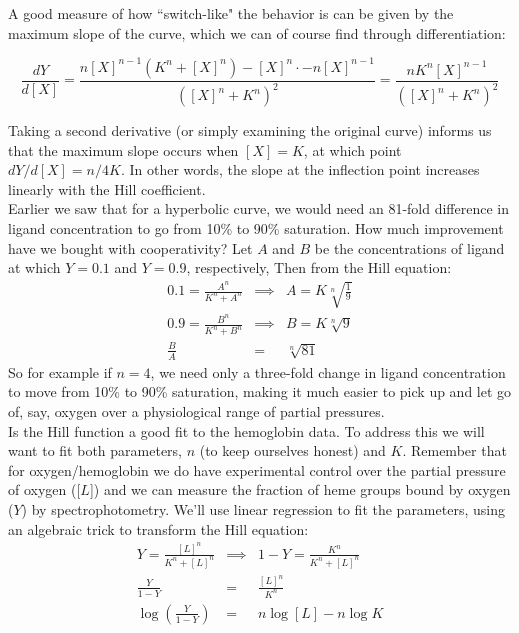 \documentclass{article}
\begin{document}
A good measure of how ``switch-like" the behavior is can be given by the maximum slope of the curve, which we can of course find through differentiation:

\[ \frac{dY}{d\left[X\right]} = \frac{n[X]^{n-1}\left(K^n + [X]^n\right) - [X]^n \cdot -n [X]^{n-1}}{\left([X]^n + K^n\right)^2} = \frac{nK^n [X]^{n-1}}{\left([X]^n + K^n\right)^2} \]

Taking a second derivative (or simply examining the original curve) informs us that the maximum slope occurs when $[X]=K$, at which point $dY/d[X] = n/4K$. In other words, the slope at the inflection point increases linearly with the Hill coefficient.\\

Earlier we saw that for a hyperbolic curve, we would need an 81-fold difference in ligand concentration to go from 10\% to 90\% saturation. How much improvement have we bought with cooperativity? Let $A$ and $B$ be the concentrations of ligand at which $Y=0.1$ and $Y=0.9$, respectively, Then from the Hill equation:
\begin{eqnarray*}
0.1 = \frac{A^n}{K^n + A^n} & \implies & A = K\sqrt[n]{\frac{1}{9}}\\
0.9 = \frac{B^n}{K^n + B^n} & \implies & B = K\sqrt[n]{9}\\
\frac{B}{A} & = & \sqrt[n]{81}
\end{eqnarray*}
So for example if $n=4$, we need only a three-fold change in ligand concentration to move from 10\% to 90\% saturation, making it much easier to pick up and let go of, say, oxygen over a physiological range of partial pressures.\\

Is the Hill function a good fit to the hemoglobin data. To address this we will want to fit both parameters, $n$ (to keep ourselves honest) and $K$. Remember that for oxygen/hemoglobin we do have experimental control over the partial pressure of oxygen ([$L$]) and we can measure the fraction of heme groups bound by oxygen ($Y$) by spectrophotometry. We'll use linear regression to fit the parameters, using an algebraic trick to transform the Hill equation:
\begin{eqnarray*}
Y = \frac{\left[ L \right]^n}{K^n + \left[ L \right]^n} & \implies & 1 - Y = \frac{K^n}{K^n + \left[ L \right]^n}\\
\frac{Y}{1-Y} & = & \frac{\left[ L \right]^n}{K^n}\\
\log \left( \frac{Y}{1-Y} \right) & = & n \log \left[ L \right] - n \log K
\end{eqnarray*}
\end{document}

